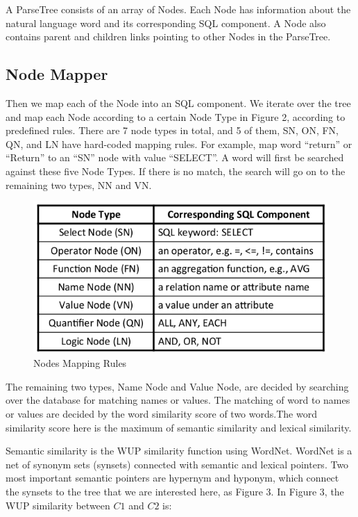 \documentclass[twocolumn]{article}
\begin{document}
A ParseTree consists of an array of Nodes. Each Node has information about the natural language word and its corresponding SQL component. A Node also contains parent and children links pointing to other Nodes in the ParseTree.

\subsection{Node Mapper}
Then we map each of the Node into an SQL component. We iterate over the tree and map each Node according to a certain Node Type in Figure 2, according to predefined rules. There are 7 node types in total, and 5 of them, SN, ON, FN, QN, and LN have hard-coded mapping rules. For example, map word “return” or “Return” to an “SN” node with value “SELECT”. A word will first be searched against these five Node Types. If there is no match, the search will go on to the remaining two types, NN and VN.

\begin{figure}[ht]
  \centering
  \includegraphics[width=0.9\linewidth]{figures/nodes_mapping_rules.png}
  \caption[caption for nodes mapping rules]{Nodes Mapping Rules\protect\footnotemark}
\end{figure}

The remaining two types, Name Node and Value Node, are decided by searching over the database for matching names or values. The matching of word to names or values are decided by the word similarity score of two words.The word similarity score here is the maximum of semantic similarity and lexical similarity.

Semantic similarity is the WUP similarity function using WordNet. WordNet is a net of synonym sets (synsets) connected with semantic and lexical pointers. Two most important semantic pointers are hypernym and hyponym, which connect the synsets to the tree that we are interested here, as Figure 3. In Figure 3, the WUP similarity between $C1$ and $C2$ is:
\end{document}
